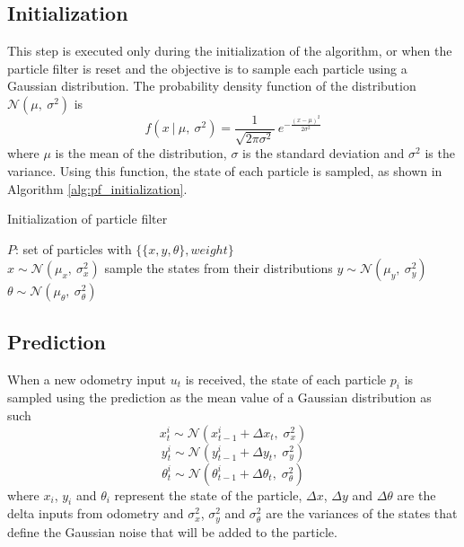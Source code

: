 
\subsection{Initialization}

This step is executed only during the initialization of the algorithm,
or when the particle filter is reset and the objective is to sample
each particle using a Gaussian distribution.
The probability density function of the distribution
$\mathcal{N}(\mu, \ \sigma^2)$ is
\begin{equation}
    f(x \ | \ \mu ,\ \sigma^2) =
    \frac{1}{\sqrt{2\pi\sigma^2}} \
    e^{ -\frac{(x-\mu)^2}{2\sigma^2} }
\end{equation}
where
$\mu$ is the mean of the distribution,
$\sigma$ is the standard deviation and
$\sigma^2$ is the variance.
Using this function, the state of each particle is sampled, as shown in
Algorithm \ref{alg:pf_initialization}.

\begin{algorithm}
    \caption{Initialization of particle filter}
    \label{alg:pf_initialization}
    \begin{algorithmic}[1]
        \State $P$: set of particles with $\{\{x, y, \theta\}, weight\}$ \\

            \State $x \sim \mathcal{N}(\mu_x, \ \sigma^2_x)$
            \Comment sample the states from their distributions
            \State $y \sim \mathcal{N}(\mu_y, \ \sigma^2_y)$
            \State $\theta \sim \mathcal{N}(\mu_\theta, \ \sigma^2_\theta)$
        \EndFor
    \end{algorithmic}
\end{algorithm}

\subsection{Prediction} \label{pf_prediction}

When a new odometry input $u_t$ is received, the state of each particle
$p_i$ is sampled using the prediction as the mean value of a Gaussian
distribution as such
\begin{equation}
    x^i_t \sim \mathcal{N}(x^i_{t-1} + \Delta x_t ,\; \sigma^2_x)
\end{equation}
\begin{equation}
    y^i_t \sim \mathcal{N}(y^i_{t-1} + \Delta y_t ,\; \sigma^2_y)
\end{equation}
\begin{equation}
    \theta^i_t \sim
    \mathcal{N}(\theta^i_{t-1} + \Delta \theta_t ,\; \sigma^2_\theta)
\end{equation}
where
$x_i$, $y_i$ and $\theta_i$ represent the state of the particle,
$\Delta x$, $\Delta y$ and $\Delta \theta$ are the delta inputs from odometry
and $\sigma^2_x$, $\sigma^2_y$ and $\sigma^2_\theta$ are the variances of
the states that define the Gaussian noise that will be added to the particle.

